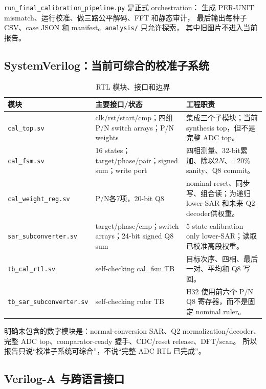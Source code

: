 \documentclass[UTF8,11pt,a4paper]{ctexart}
\newcommand{\code}[1]{\texttt{\small #1}}
\newcommand{\pathcode}[1]{{\small\nolinkurl{#1}}}
\newcommand{\tablehead}{\rowcolor{PaleBlue}\bfseries\sffamily\color{DeepNavy}}
\begin{document}
\code{run\_final\_calibration\_pipeline.py} 是正式 orchestration：
生成 PER-UNIT mismatch、运行校准、做三路公平解码、FFT 和静态审计，
最后输出每种子 CSV、case JSON 和 manifest。\code{analysis/} 只允许探索，
其中旧图片不进入当前报告。

\subsection{SystemVerilog：当前可综合的校准子系统}

\begin{table}[htbp]
  \centering
  \caption{RTL 模块、接口和边界}
  \small
  \begin{tabularx}{\textwidth}{@{}p{31mm}p{46mm}Y@{}}
    \toprule
    \tablehead 模块 & 主要接口/状态 & 工程职责\\
    \midrule
    \code{cal\_top.sv} &
      clk/rst/start/cmp；四组 P/N switch arrays；P/N weights &
      集成三个子模块；当前 synthesis top，但不是完整 ADC top。\\
    \code{cal\_fsm.sv} &
      16 states；target/phase/pair；signed sum；write port &
      四相测量、32-bit累加、除以$2N$、±20\% sanity、Q8 commit。\\
    \pathcode{cal_weight_reg.sv} &
      P/N各7项，20-bit Q8 &
      nominal reset、同步写、组合读；为递归 lower-SAR 和未来 Q2 decoder供权重。\\
    \pathcode{sar_subconverter.sv} &
      target/phase/cmp；switch arrays；24-bit signed Q8 sum &
      5-state calibration-only lower-SAR；读取已校准高段权重。\\
    \code{tb\_cal\_rtl.sv} &
      self-checking cal\_fsm TB &
      目标次序、四相、最后一对、平均和 Q8 写回。\\
    \pathcode{tb_sar_subconverter.sv} &
      self-checking ruler TB &
      H32 使用前六个 P/N Q8 寄存器，而不是固定 nominal ruler。\\
    \bottomrule
  \end{tabularx}
\end{table}

明确未包含的数字模块是：normal-conversion SAR、Q2 normalization/decoder、
完整 ADC top、comparator-ready 握手、CDC/reset release、DFT/scan。
所以报告只说“校准子系统可综合”，不说“完整 ADC RTL 已完成”。

\subsection{Verilog-A 与跨语言接口}
\end{document}
